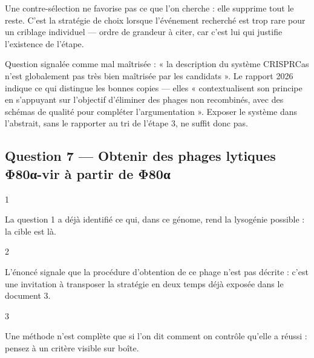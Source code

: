 \documentclass[11pt,a4paper]{article}
\begin{document}
\begin{methode}

Une contre-sélection ne favorise pas ce que l'on cherche : elle supprime tout le reste. C'est la stratégie de choix lorsque l'événement recherché est trop rare pour un criblage individuel --- ordre de grandeur à citer, car c'est lui qui justifie l'existence de l'étape.

\end{methode}

\begin{jury}

Question signalée comme mal maîtrisée : « la description du système CRISPRCas n'est globalement pas très bien maîtrisée par les candidats ». Le rapport 2026 indique ce qui distingue les bonnes copies --- elles « contextualisent son principe en s'appuyant sur l'objectif d'éliminer des phages non recombinés, avec des schémas de qualité pour compléter l'argumentation ». Exposer le système dans l'abstrait, sans le rapporter au tri de l'étape 3, ne suffit donc pas.

\end{jury}

\hypertarget{question-7-obtenir-des-phages-lytiques-ux3c680ux3b1-vir-uxe0-partir-de-ux3c680ux3b1}{%
\subsection{Question 7 --- Obtenir des phages lytiques Φ80α-vir à partir de Φ80α}\label{question-7-obtenir-des-phages-lytiques-ux3c680ux3b1-vir-uxe0-partir-de-ux3c680ux3b1}}

\begin{indication}{1}

La question 1 a déjà identifié ce qui, dans ce génome, rend la lysogénie possible : la cible est là.

\end{indication}

\begin{indication}{2}

L'énoncé signale que la procédure d'obtention de ce phage n'est pas décrite : c'est une invitation à transposer la stratégie en deux temps déjà exposée dans le document 3.

\end{indication}

\begin{indication}{3}

Une méthode n'est complète que si l'on dit comment on contrôle qu'elle a réussi : pensez à un critère visible sur boîte.

\end{indication}
\end{document}
